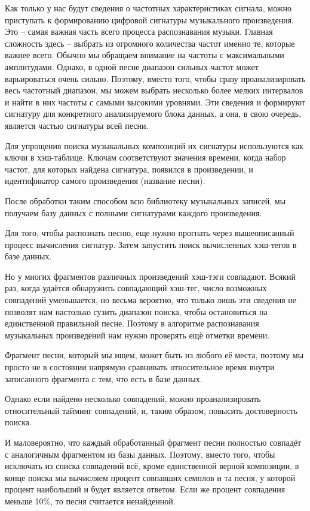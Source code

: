 Как только у нас будут сведения о частотных характеристиках сигнала, можно приступать к формированию цифровой сигнатуры музыкального произведения. Это – самая важная часть всего процесса распознавания музыки. Главная сложность здесь – выбрать из огромного количества частот именно те, которые важнее всего. Обычно мы обращаем внимание на частоты с максимальными амплитудами. Однако, в одной песне диапазон сильных частот может варьироваться очень сильно. Поэтому, вместо того, чтобы сразу проанализировать весь частотный диапазон, мы можем выбрать несколько более мелких интервалов и найти в них частоты с самыми высокими уровнями. Эти сведения и формируют сигнатуру для конкретного анализируемого блока данных, а она, в свою очередь, является частью сигнатуры всей песни.

Для упрощения поиска музыкальных композиций их сигнатуры используются как ключи в хэш-таблице. Ключам соответствуют значения времени, когда набор частот, для которых найдена сигнатура, появился в произведении, и идентификатор самого произведения (название песни). 

После обработки таким способом всю библиотеку музыкальных записей, мы получаем базу данных с полными сигнатурами каждого произведения.

Для того, чтобы распознать песню, еще нужно прогнать через вышеописанный процесс вычисления сигнатур. Затем запустить поиск вычисленных хэш-тегов в базе данных.

Но у многих фрагментов различных произведений хэш-тэги совпадают. Всякий раз, когда удаётся обнаружить совпадающий хэш-тег, число возможных совпадений уменьшается, но весьма вероятно, что только лишь эти сведения не позволят нам настолько сузить диапазон поиска, чтобы остановиться на единственной правильной песне. Поэтому в алгоритме распознавания музыкальных произведений нам нужно проверять ещё отметки времени.

Фрагмент песни, который мы ищем, может быть из любого её места, поэтому мы просто не в состоянии напрямую сравнивать относительное время внутри записанного фрагмента с тем, что есть в базе данных. 

Однако если найдено несколько совпадений, можно проанализировать относительный тайминг совпадений, и, таким образом, повысить достоверность поиска.

И маловероятно, что каждый обработанный фрагмент песни полностью совпадёт с аналогичным фрагментом из базы данных. Поэтому, вместо того, чтобы исключать из списка совпадений всё, кроме единственной верной композиции, в конце поиска мы вычисляем процент совпавших семплов и та песня, у которой процент наибольший и будет является ответом. Если же процент совпадения меньше 10\%, то песня считается ненайденной.

\pagebreak
